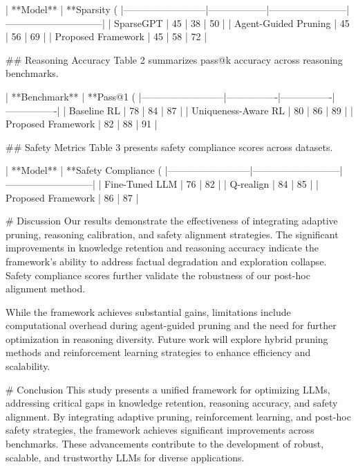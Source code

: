 | **Model**               | **Sparsity (%
|--------------------------|------------------|------------------------|------------------------------|  
| SparseGPT               | 45               | 38                    | 50                           |  
| Agent-Guided Pruning    | 45               | 56                    | 69                           |  
| Proposed Framework      | 45               | 58                    | 72                           |  

## Reasoning Accuracy  
Table 2 summarizes pass@k accuracy across reasoning benchmarks.  

| **Benchmark**           | **Pass@1 (%
|--------------------------|----------------|----------------|----------------|  
| Baseline RL             | 78             | 84             | 87             |  
| Uniqueness-Aware RL     | 80             | 86             | 89             |  
| Proposed Framework      | 82             | 88             | 91             |  

## Safety Metrics  
Table 3 presents safety compliance scores across datasets.  

| **Model**               | **Safety Compliance (%
|--------------------------|---------------------------|---------------------------|  
| Fine-Tuned LLM          | 76                        | 82                        |  
| Q-realign               | 84                        | 85                        |  
| Proposed Framework      | 86                        | 87                        |  

# Discussion  
Our results demonstrate the effectiveness of integrating adaptive pruning, reasoning calibration, and safety alignment strategies. The significant improvements in knowledge retention and reasoning accuracy indicate the framework's ability to address factual degradation and exploration collapse. Safety compliance scores further validate the robustness of our post-hoc alignment method.

While the framework achieves substantial gains, limitations include computational overhead during agent-guided pruning and the need for further optimization in reasoning diversity. Future work will explore hybrid pruning methods and reinforcement learning strategies to enhance efficiency and scalability.

# Conclusion  
This study presents a unified framework for optimizing LLMs, addressing critical gaps in knowledge retention, reasoning accuracy, and safety alignment. By integrating adaptive pruning, reinforcement learning, and post-hoc safety strategies, the framework achieves significant improvements across benchmarks. These advancements contribute to the development of robust, scalable, and trustworthy LLMs for diverse applications.

